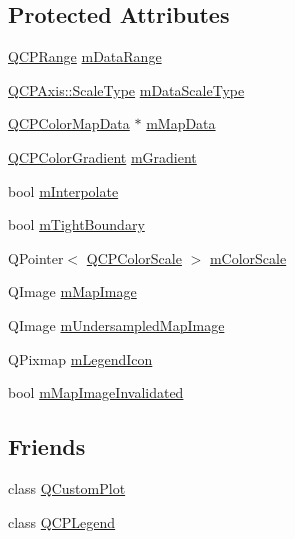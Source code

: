 \subsection*{Protected Attributes}
\begin{DoxyCompactItemize}
\item 
\hyperlink{class_q_c_p_range}{Q\+C\+P\+Range} \hyperlink{class_q_c_p_color_map_ab87609621d16cd3e9d52ad070b327b08}{m\+Data\+Range}
\item 
\hyperlink{class_q_c_p_axis_a36d8e8658dbaa179bf2aeb973db2d6f0}{Q\+C\+P\+Axis\+::\+Scale\+Type} \hyperlink{class_q_c_p_color_map_ab28a4b2def408f83b9818799d5f18446}{m\+Data\+Scale\+Type}
\item 
\hyperlink{class_q_c_p_color_map_data}{Q\+C\+P\+Color\+Map\+Data} $\ast$ \hyperlink{class_q_c_p_color_map_a8709272aa8f0be3ca111bf3866806f8b}{m\+Map\+Data}
\item 
\hyperlink{class_q_c_p_color_gradient}{Q\+C\+P\+Color\+Gradient} \hyperlink{class_q_c_p_color_map_aab77fe9a8df6f0486ab3507cc5f278fa}{m\+Gradient}
\item 
bool \hyperlink{class_q_c_p_color_map_af77e5eba9a844592648edeb6fbe834f1}{m\+Interpolate}
\item 
bool \hyperlink{class_q_c_p_color_map_ac2e9425fe4381b496726e1c09f978302}{m\+Tight\+Boundary}
\item 
Q\+Pointer$<$ \hyperlink{class_q_c_p_color_scale}{Q\+C\+P\+Color\+Scale} $>$ \hyperlink{class_q_c_p_color_map_a95b4100bacc3387652c988b071ec9db7}{m\+Color\+Scale}
\item 
Q\+Image \hyperlink{class_q_c_p_color_map_a66110813b42eca78b64095b2a1f285a0}{m\+Map\+Image}
\item 
Q\+Image \hyperlink{class_q_c_p_color_map_acad3d52f3572436d5f2e4057911ea8d3}{m\+Undersampled\+Map\+Image}
\item 
Q\+Pixmap \hyperlink{class_q_c_p_color_map_ada522988db02cb531767d38c5029ef60}{m\+Legend\+Icon}
\item 
bool \hyperlink{class_q_c_p_color_map_ac9aea6a5c193d7fa866bc7b26e79ef2c}{m\+Map\+Image\+Invalidated}
\end{DoxyCompactItemize}
\subsection*{Friends}
\begin{DoxyCompactItemize}
\item 
class \hyperlink{class_q_c_p_color_map_a1cdf9df76adcfae45261690aa0ca2198}{Q\+Custom\+Plot}
\item 
class \hyperlink{class_q_c_p_color_map_a8429035e7adfbd7f05805a6530ad5e3b}{Q\+C\+P\+Legend}
\end{DoxyCompactItemize}
